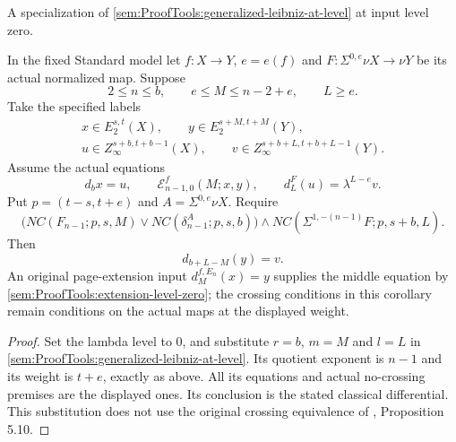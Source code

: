 \begin{corollary}
\label{sem:ProofTools:ss-leibniz-specialization}
A specialization of
\ref{sem:ProofTools:generalized-leibniz-at-level} at input level zero.

In the fixed Standard model let $f:X\to Y$, $e=e(f)$ and
$F:\Sigma^{0,e}\nu X\to\nu Y$ be its actual normalized map. Suppose
\[
2\le n\le b,\qquad e\le M\le n-2+e,\qquad L\ge e.
\]
Take the specified labels
\[
\begin{gathered}
x\in E_2^{s,t}(X),\qquad y\in E_2^{s+M,t+M}(Y),\\
u\in Z_\infty^{s+b,t+b-1}(X),\qquad
v\in Z_\infty^{s+b+L,t+b+L-1}(Y).
\end{gathered}
\]
Assume the actual equations
\[
d_bx=u,\qquad \mathcal E^f_{n-1,0}(M;x,y),\qquad
d_L^F(u)=\lambda^{L-e}v.
\]
Put $p=(t-s,t+e)$ and $A=\Sigma^{0,e}\nu X$. Require
\[
\bigl(NC(F_{n-1};p,s,M)\lor
 NC(\delta_{n-1}^A;p,s,b)\bigr)
\land NC(\Sigma^{1,-(n-1)}F;p,s+b,L).
\]
Then
\[
d_{b+L-M}(y)=v.
\]
An original page-extension input $d_M^{f,E_n}(x)=y$ supplies the
middle equation by \ref{sem:ProofTools:extension-level-zero}; the
crossing conditions in this corollary remain conditions on the actual
maps at the displayed weight.
\end{corollary}
\begin{proof}
Set the lambda level to $0$, and substitute $r=b$, $m=M$ and $l=L$
in \ref{sem:ProofTools:generalized-leibniz-at-level}. Its quotient
exponent is $n-1$ and its weight is $t+e$, exactly as above. All its
equations and actual no-crossing premises are the displayed ones.
Its conclusion is the stated classical differential. This substitution
does not use the original crossing equivalence of \cite{LWX126}, Proposition 5.10.
\end{proof}

